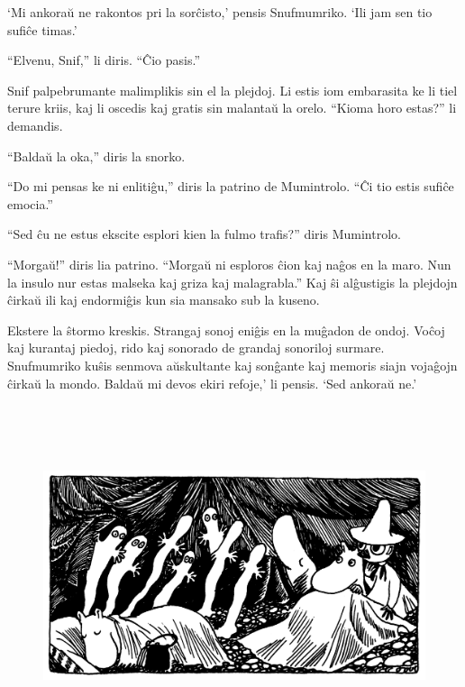 `Mi ankoraŭ ne rakontos pri la sorĉisto,' pensis Snufmumriko. `Ili jam sen tio sufiĉe timas.'

``Elvenu, Snif,'' li diris. ``Ĉio pasis.''

Snif palpebrumante malimplikis sin el la plejdoj. Li estis iom embarasita ke li tiel terure kriis, kaj li oscedis kaj gratis sin malantaŭ la orelo. ``Kioma horo estas?'' li demandis.

``Baldaŭ la oka,'' diris la snorko.

``Do mi pensas ke ni enlitiĝu,'' diris la patrino de Mumintrolo. ``Ĉi tio estis sufiĉe emocia.''

``Sed ĉu ne estus ekscite esplori kien la fulmo trafis?'' diris Mumintrolo.

``Morgaŭ!'' diris lia patrino. ``Morgaŭ ni esploros ĉion kaj naĝos en la maro. Nun la insulo nur estas malseka kaj griza kaj malagrabla.'' Kaj ŝi alĝustigis la plejdojn ĉirkaŭ ili kaj endormiĝis kun sia mansako sub la kuseno.

Ekstere la ŝtormo kreskis. Strangaj sonoj eniĝis en la muĝadon de ondoj. Voĉoj kaj kurantaj piedoj, rido kaj sonorado de grandaj sonoriloj surmare. Snufmumriko kuŝis senmova aŭskultante kaj sonĝante kaj memoris siajn vojaĝojn ĉirkaŭ la mondo. Baldaŭ mi devos ekiri refoje,' li pensis. `Sed ankoraŭ ne.'

\chapter[Kvara Ĉapitro]{}


\begin{figure}[htbp]
\centering
\includegraphics[width=450pt,height=246pt]{_16.jpg}
\caption{}
\label{_16}
\end{figure}

